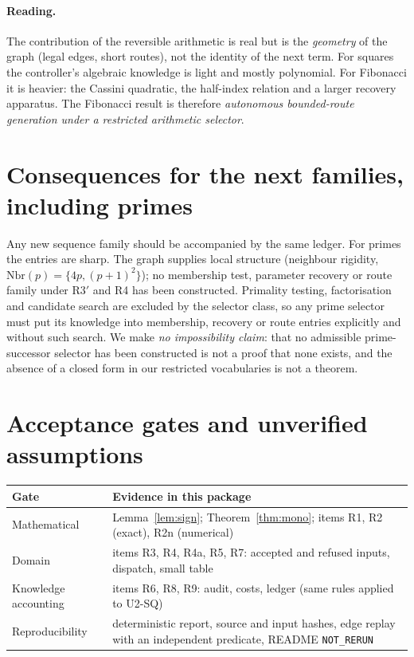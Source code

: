 \documentclass[11pt]{article}
\theoremstyle{definition}
\theoremstyle{remark}
\begin{document}
\paragraph{Reading.} The contribution of the reversible arithmetic is real but is the \emph{geometry} of the graph (legal edges, short routes), not the identity of the next term. For squares the controller's algebraic knowledge is light and mostly polynomial. For Fibonacci it is heavier: the Cassini quadratic, the half-index relation and a larger recovery apparatus. The Fibonacci result is therefore \emph{autonomous bounded-route generation under a restricted arithmetic selector}.

\section{Consequences for the next families, including primes}
Any new sequence family should be accompanied by the same ledger. For primes the entries are sharp. The graph supplies local structure (neighbour rigidity, $\mathrm{Nbr}(p)=\{4p,(p+1)^2\}$); no membership test, parameter recovery or route family under R3$'$ and R4 has been constructed. Primality testing, factorisation and candidate search are excluded by the selector class, so any prime selector must put its knowledge into membership, recovery or route entries explicitly and without such search. We make \emph{no impossibility claim}: that no admissible prime-successor selector has been constructed is not a proof that none exists, and the absence of a closed form in our restricted vocabularies is not a theorem.

\section{Acceptance gates and unverified assumptions}
\begin{center}\small
\begin{tabular}{@{}p{3.0cm}p{9.5cm}@{}}\toprule
Gate & Evidence in this package\\\midrule
Mathematical & Lemma~\ref{lem:sign}; Theorem~\ref{thm:mono}; items R1, R2 (exact), R2n (numerical)\\
Domain & items R3, R4, R4a, R5, R7: accepted and refused inputs, dispatch, small table\\
Knowledge accounting & items R6, R8, R9: audit, costs, ledger (same rules applied to U2-SQ)\\
Reproducibility & deterministic report, source and input hashes, edge replay with an independent predicate, README \texttt{NOT\_RERUN}\\\bottomrule
\end{tabular}\end{center}
\end{document}
